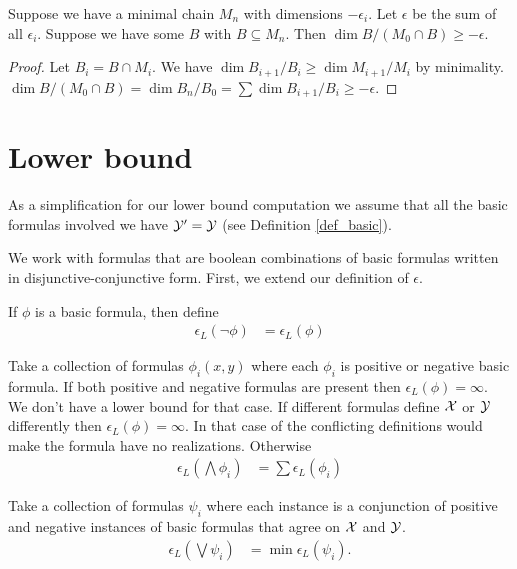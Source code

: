 \begin{Lemma} \label{chain_intersect}
  Suppose we have a minimal chain $M_n$ with dimensions $-\epsilon_i$.
  Let $\epsilon$ be the sum of all $\epsilon_i$.
  Suppose we have some $B$ with $B \subseteq M_n$.
  Then $\dim B / (M_0 \cap B) \geq -\epsilon$.
\end{Lemma}

\begin{proof}
  Let $B_i = B \cap M_i$.
  We have $\dim B_{i+1}/B_i \geq \dim M_{i+1}/M_i$ by minimality.
  $\dim B / (M_0 \cap B) = \dim B_n / B_0 = \sum \dim B_{i+1}/B_i \geq -\epsilon$.
\end{proof}

\section{Lower bound}

As a simplification for our lower bound computation we assume that all the basic formulas involved we have $\mathcal Y' = \mathcal Y$ (see Definition \ref{def_basic}).

We work with formulas that are boolean combinations of basic formulas written in disjunctive-conjunctive form.
First, we extend our definition of $\epsilon$.

\begin{Definition}[Negation]
  If $\phi$ is a basic formula, then define
  \begin{align*}
    \epsilon_L(\neg \phi) &= \epsilon_L(\phi)
  \end{align*}
\end{Definition}

\begin{Definition}[Conjunction]
  Take a collection of formulas $\phi_i(x, y)$ where each $\phi_i$ is positive or negative basic formula.
  If both positive and negative formulas are present then $\epsilon_L(\phi) = \infty$.
  We don't have a lower bound for that case.
  If different formulas define $\mathcal X$ or $\mathcal Y$ differently then $\epsilon_L(\phi) = \infty$.
  In that case of the conflicting definitions would make the formula have no realizations.
  Otherwise
  \begin{align*}
    \epsilon_L(\bigwedge \phi_i) &= \sum \epsilon_L(\phi_i)
  \end{align*}
\end{Definition}

\begin{Definition} [Disjunction]
  Take a collection of formulas $\psi_i$ where each instance is a conjunction of positive and negative instances of basic formulas that agree on $\mathcal X$ and $\mathcal Y$. %
  \begin{align*}
    \epsilon_L(\bigvee \psi_i) &= \min \epsilon_L(\psi_i).
  \end{align*}
\end{Definition}


